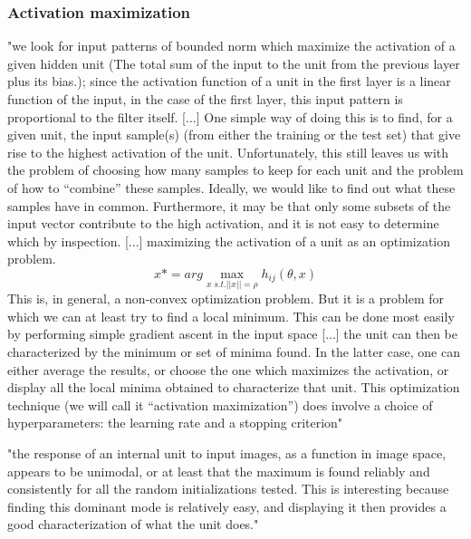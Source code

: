 		\subsubsection{Activation maximization}
		"we look for input patterns of bounded norm which maximize the activation of a given hidden unit (The total sum of the input to the unit from the previous layer plus its bias.); since the activation function of a unit in the first layer is a linear function of the input, in the case of the first layer, this input pattern is proportional to the filter itself. [...] 
		One simple way of doing this is to find, for a given unit, the input sample(s) (from either the training or the test set) that give rise to the highest activation of the unit. Unfortunately, this still leaves us with the problem of choosing how many samples to keep for each unit and the problem of how to “combine” these samples. Ideally, we would like to find out what these samples have in common. Furthermore, it may be that only some subsets of the input vector contribute to the high activation, and it is not easy to determine which by inspection.
		[...]
		maximizing the activation of a unit as an optimization problem.
		\begin{equation}
		x* = arg \max\limits_{x \; s.t. ||x||=\rho} h_{ij}(\theta,x)
		\end{equation}
		This is, in general, a non-convex optimization problem. But it is a problem for which we can at least try to find a local minimum. This can be done most easily by performing simple gradient ascent in the input space [...] 
		the unit can then be characterized by the minimum or set of minima found. In the latter case, one can either average the results, or choose the one which maximizes the activation, or display all the local minima obtained to characterize that unit.
		This optimization technique (we will call it “activation maximization”) does involve a choice of hyperparameters: the learning rate and a stopping criterion" \cite{Erhan2009}
		
		"the response of an internal unit to input images, as a function in image space, appears to be unimodal, or at least that the maximum is found reliably and consistently for all the random initializations tested. This is interesting because finding this dominant mode is relatively easy, and displaying it then provides a good characterization of what the unit does." \cite{Erhan2009}
		

